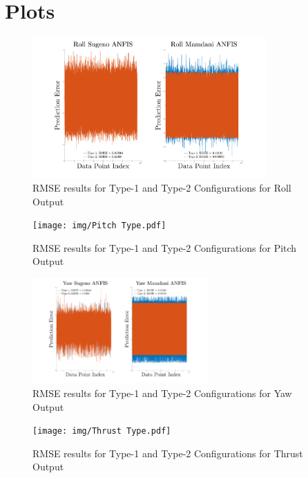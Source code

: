\appendix
\chapter{Plots}
\begin{figure}[H]
    \centering
    \includegraphics[width = 0.8\textwidth]{img/Roll Type.pdf}
    \caption{RMSE results for Type-1 and Type-2 Configurations for Roll Output}
    \label{fig:roll_type}
\end{figure}
\begin{figure}[H]
    \centering
    \texttt{[image: img/Pitch Type.pdf]}
    \caption{RMSE results for Type-1 and Type-2 Configurations for Pitch Output}
    \label{fig:pitch_type}
\end{figure}
\begin{figure}[H]
    \centering
    \includegraphics[width = 0.6\textwidth]{img/Yaw Type2.pdf}
    \caption{RMSE results for Type-1 and Type-2 Configurations for Yaw Output}
    \label{fig:yaw_type}
\end{figure}
\begin{figure}[H]
    \centering
    \texttt{[image: img/Thrust Type.pdf]}
    \caption{RMSE results for Type-1 and Type-2 Configurations for Thrust Output}
    \label{fig:thrust_type}
\end{figure}
